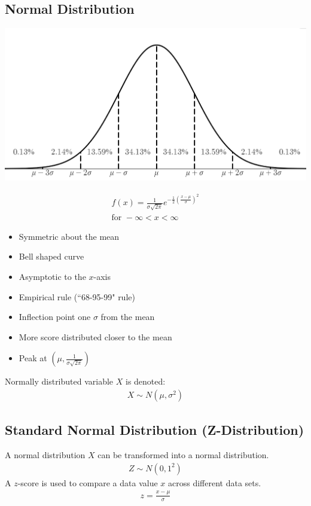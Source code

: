 \documentclass[10pt, a4paper, titlepage]{article}
\begin{document}
\begin{multicols*}{3}
	\subsection{Normal Distribution}
	\begin{center}
		\includegraphics[width=0.9\linewidth]{normal_distribution.png}\\
	\end{center}
	\begin{align}
		f(x)=\frac{1}{\sigma \sqrt{2\pi}}e^{-\frac{1}{2}\left(\frac{x-\mu}{\sigma}\right)^2}\\
		\text{for }-\infty <x<\infty
	\end{align}
	\begin{itemize}
		\item Symmetric about the mean
		\item Bell shaped curve
		\item Asymptotic to the $x$-axis
		\item Empirical rule (``68-95-99" rule)
		\item Inflection point one $\sigma$ from the mean
		\item More score distributed closer to the mean
		\item Peak at $(\mu ,\frac{1}{\sigma \sqrt{2\pi}})$
	\end{itemize}
	Normally distributed variable $X$ is denoted:
	\begin{align}
		X\sim N(\mu ,\sigma ^2)
	\end{align}

	\dotfill
	\subsection{Standard Normal Distribution (Z-Distribution)}
	A normal distribution $X$ can be transformed into a normal distribution.
	\begin{align}
		Z\sim N(0,1^2)
	\end{align}
	A $z$-score is used to compare a data value $x$ across different data sets.
	\begin{align}
		z=\frac{x-\mu}{\sigma}
	\end{align}



\end{multicols*}
\end{document}
